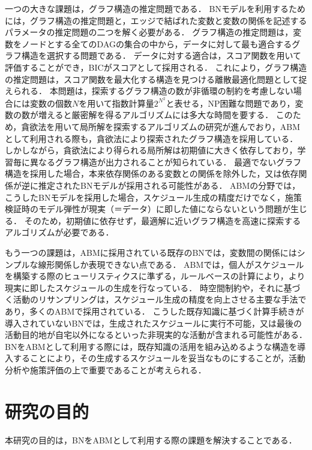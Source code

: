 一つの大きな課題は，グラフ構造の推定問題である．
BNモデルを利用するためには，グラフ構造の推定問題と，エッジで結ばれた変数と変数の関係を記述するパラメータの推定問題の二つを解く必要がある．
グラフ構造の推定問題は，変数をノードとする全てのDAGの集合の中から，データに対して最も適合するグラフ構造を選択する問題である．
データに対する適合は，スコア関数を用いて評価することができ，BICがスコアとして採用される\cite{Baydin2018}．
これにより，グラフ構造の推定問題は，スコア関数を最大化する構造を見つける離散最適化問題として捉えられる．
本問題は，探索するグラフ構造の数が非循環の制約を考慮しない場合には変数の個数$N$を用いて指数計算量$2^{N^2}$と表せる，NP困難な問題であり，変数の数が増えると厳密解を得るアルゴリズムには多大な時間を要する\cite{Baydin2018}．
このため，貪欲法を用いて局所解を探索するアルゴリズムの研究が進んでおり\cite{Baydin2018}，ABMとして利用される際も，貪欲法により探索されたグラフ構造を採用している．
しかしながら，貪欲法により得られる局所解は初期値に大きく依存しており，学習毎に異なるグラフ構造が出力されることが知られている\cite{Baydin2018}．
最適でないグラフ構造を採用した場合，本来依存関係のある変数との関係を除外した，又は依存関係が逆に推定されたBNモデルが採用される可能性がある．
ABMの分野では，こうしたBNモデルを採用した場合，スケジュール生成の精度だけでなく，施策検証時のモデル弾性が現実（＝データ）に即した値にならないという問題が生じる．
そのため，初期値に依存せず，最適解に近いグラフ構造を高速に探索するアルゴリズムが必要である．

もう一つの課題は，ABMに採用されている既存のBNでは，変数間の関係にはシンプルな線形関係しか表現できない点である\cite{Baydin2018}．
ABMでは，個人がスケジュールを構築する際のヒューリスティクスに準ずる，ルールベースの計算により，より現実に即したスケジュールの生成を行なっている．
時空間制約や，それに基づく活動のリサンプリングは，スケジュール生成の精度を向上させる主要な手法であり，多くのABMで採用されている\cite{Baydin2018}．
こうした既存知識に基づく計算手続きが導入されていないBNでは，生成されたスケジュールに実行不可能，又は最後の活動目的地が自宅以外になるといった非現実的な活動が含まれる可能性がある．
BNをABMとして利用する際には，既存知識の活用を組み込めるような構造を導入することにより，その生成するスケジュールを妥当なものにすることが，活動分析や施策評価の上で重要であることが考えられる．

\section{研究の目的}\label{1.2}
本研究の目的は，BNをABMとして利用する際の課題を解決することである．

